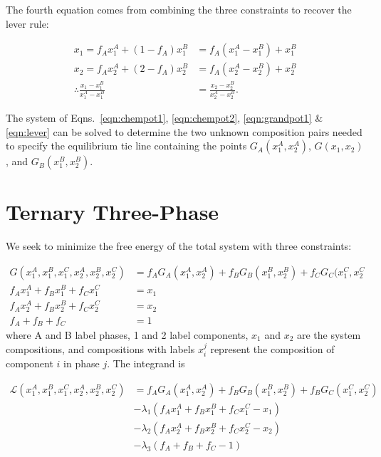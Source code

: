 \documentclass[10pt]{article}
\begin{document}
The fourth equation comes from combining the three constraints to recover the lever rule:

\begin{align}
  x_1 = f_A x_1^A + (1 - f_A) x_1^B &= f_A(x_1^A - x_1^B) + x_1^B\\
  x_2 = f_A x_2^A + (2 - f_A) x_2^B &= f_A(x_2^A - x_2^B) + x_2^B\\
  \label{eqn:lever}
  \therefore \frac{x_1 - x_1^B}{x_1^A - x_1^B} &= \frac{x_2 - x_2^B}{x_2^A - x_2^B}.
\end{align}

The system of Eqns.~\ref{eqn:chempot1}, \ref{eqn:chempot2}, \ref{eqn:grandpot1}
\& \ref{eqn:lever} can be solved to determine the two unknown composition pairs
needed to specify the equilibrium tie line containing the points
$G_A(x_1^A,x_2^A)$, $G(x_1,x_2)$, and $G_B(x_1^B,x_2^B)$.

\newpage
\section*{Ternary Three-Phase}

We seek to minimize the free energy of the total system with three constraints:

\begin{align}
  G(x_1^A, x_1^B, x_1^C, x_2^A, x_2^B, x_2^C) &= f_A G_A(x_1^A,x_2^A) + f_B G_B(x_1^B, x_2^B) + f_C G_C(x_1^C, x_2^C\\
  f_A x_1^A + f_B x_1^B + f_C x_1^C &= x_1\\
  f_A x_2^A + f_B x_2^B + f_C x_2^C &= x_2\\
  f_A + f_B + f_C &= 1
\end{align}
where A and B label phases, 1 and 2 label components, $x_1$ and $x_2$ are the system compositions,
and compositions with labels $x_i^j$ represent the composition of component $i$ in phase $j$.
The integrand is

\begin{align}
  \nonumber
  \mathcal{L}(x_1^A, x_1^B, x_1^C, x_2^A, x_2^B, x_2^C)
                         &= f_A G_A(x_1^A, x_2^A) + f_B G_B(x_1^B, x_2^B) + f_B G_C(x_1^C, x_2^C)\\
  \nonumber
                         &- \lambda_1(f_A x_1^A + f_B x_1^B + f_C x_1^C - x_1)\\
  \nonumber
                         &- \lambda_2(f_A x_2^A + f_B x_2^B + f_C x_2^C - x_2)\\
                         &- \lambda_3(f_A + f_B + f_C - 1)
\end{align}
\end{document}
